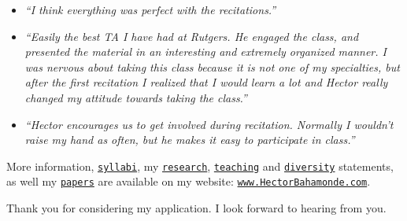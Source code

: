 \documentclass[10pt,stdletter,dateno,sigleft]{newlfm} %
\begin{document}
\begin{newlfm}
{\begin{itemize}
\item \emph{``I think everything was perfect with the recitations.''}

\item \emph{``Easily the best TA I have had at Rutgers. He engaged the class, and presented the material in an interesting and extremely organized manner. I was nervous about taking this class because it is not one of my specialties, but after the first recitation I realized that I would learn a lot and Hector really changed my attitude towards taking the class.''}

\item \emph{``Hector encourages us to get involved during recitation. Normally I wouldn't raise my hand as often, but he makes it easy to participate in class.''}

\end{itemize}

}

More information, \href{http://www.hectorbahamonde.com/teaching/}{\texttt{syllabi}}, my \href{http://github.com/hbahamonde/Job_Market/raw/master/Bahamonde_Research_Statement.pdf}{\texttt{research}}, \href{http://github.com/hbahamonde/Job_Market/raw/master/Bahamonde_Teaching_Statement.pdf}{\texttt{teaching}} and \href{http://github.com/hbahamonde/Job_Market/raw/master/Bahamonde_Diversity_Statement.pdf}{\texttt{diversity}} statements, as well my \href{http://www.hectorbahamonde.com/research/}{\texttt{papers}} are available on my website: \href{http://www.hectorbahamonde.com}{\texttt{www.HectorBahamonde.com}}. 

Thank you for considering my application. I look forward to hearing from you.









\vspace{-10cm}



\end{newlfm}
\end{document}
